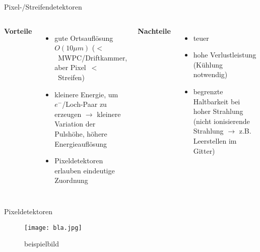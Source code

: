 \begin{frame}{Pixel-/Streifendetektoren}
    \begin{columns}[T]
			\textbf{Vorteile}		
			\begin{itemize}
			  \item gute Ortsauflösung $O(10\mu m)$  ($<$~MWPC/Driftkammer, aber Pixel~$<$~Streifen)
			  \item kleinere Energie, um $e^-$/Loch-Paar zu erzeugen $\rightarrow$ kleinere Variation der
			  Pulshöhe, höhere Energieauflösung
			  \item Pixeldetektoren erlauben eindeutige Zuordnung
			\end{itemize}	
	    	\textbf{Nachteile}
	    	\begin{itemize}
			  \item teuer
			  \item hohe Verlustleistung (Kühlung notwendig)
			  \item begrenzte Haltbarkeit bei hoher Strahlung (nicht ionisierende Strahlung $\rightarrow$
			  z.B. Leerstellen im Gitter)
			\end{itemize}
    \end{columns}
   \end{frame}
   
   \begin{frame}{Pixeldetektoren}
			\begin{figure}[htbp]
			  \centering
			  \texttt{[image: bla.jpg]}
			  \caption{beispielbild}
			\end{figure}
\end{frame}
